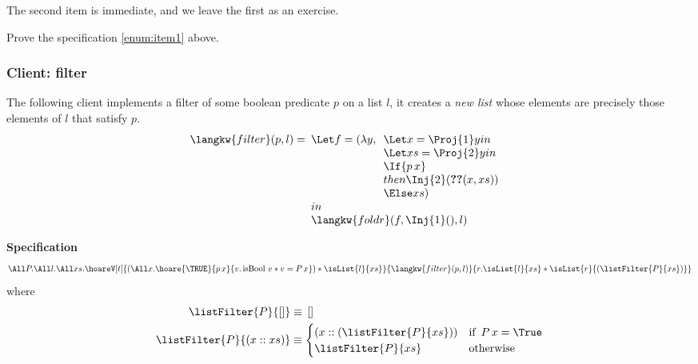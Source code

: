 The second item is immediate, and we leave the first as an exercise.
\begin{exercise}
Prove the specification \eqref{enum:item1} above.
\end{exercise}



\subsubsection*{Client: filter}
The following client implements a filter of some boolean predicate $p$ on a list $l$, \ie{} it creates a \emph{new list} whose elements are precisely those elements of $l$ that satisfy $p$.
\begin{displaymath}
    {\langkw{filter} (p, l) =}
    \begin{array}[t]{l}
      \Let f = (\lambda y, \begin{array}[t]{l}
                             \Let x = \Proj{1}  y in\\
                             \Let xs = \Proj{2} y  in\\
                             \If {p\, x} \\
                             then \Inj{2} (\Ref (x, xs) ) \\
                             \Else  xs
                             )
                           \end{array}\\
      in \\
      \langkw{foldr}(f, \Inj{1}(), l)
    \end{array}
  \end{displaymath}
  
 \noindent \textbf{Specification}
\begin{align*}
\All P. \All l. \All xs. 
\hoareV[t]{ \left( \All x. \hoare{\TRUE}{p \, x}{v. \operatorname{isBool} \, v \ast v = P \, x}\right)
\ast \isList {l} {xs} }{\langkw{filter}(p, l)}{r.  \isList {l} {xs} \ast \isList {r} {\left( \listFilter {P} {xs} \right)}}
\end{align*}
where
\begin{align*}
\listFilter {P} {[]} &\equiv \, [] \\
\listFilter {P} {(x :: xs)} &\equiv \begin{cases} \left( x :: \left( \listFilter {P} {xs} \right) \right)
													  & \text{if } \, P \, x = \True  \\
\listFilter {P} {xs}  & \text{otherwise } \end{cases}
\end{align*}

